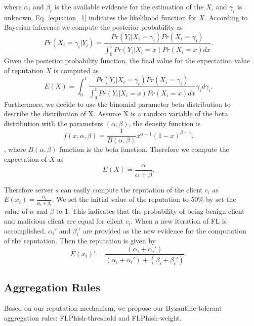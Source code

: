 \documentclass[journal]{IEEEtran}
\begin{document}
where $\alpha_i$ and $\beta_i$ is the available evidence for the estimation of the $X$, and $\gamma_i$ is unknown. Eq. \ref{equation_1} indicates the likelihood function for $X$. According to Bayesian inference we compute the posterior probability as
\begin{equation}
    Pr(X_i=\gamma _i|Y_i)=\frac{Pr\left ( Y_{i}|X_{i}=\gamma_{i} \right )Pr(X_{i}=\gamma_{i})}{\int_{0}^{1}Pr\left ( Y_{i}|X_{i}=x \right )Pr(X_{i}=x)dx}\label{equation_2}.
\end{equation}
Given the posterior probability function, the final value for the expectation value of reputation $X$ is computed as
\begin{equation}
    E(X)=\int_{0}^{1}\frac{Pr\left ( Y_{i}|X_{i}=\gamma_{i} \right )Pr(X_{i}=\gamma_{i})}{\int_{0}^{1}Pr\left ( Y_{i}|X_{i}=x \right )Pr(X_{i}=x)dx}\gamma_{i}d\gamma_{i}\label{equation_3}.
\end{equation}
Furthermore, we decide to use the binomial parameter beta distribution to describe the distribution of X. Assume X is a random variable of the beta distribution with the parameters $(\alpha, \beta)$, the density function is
\begin{equation}
    f(x,\alpha,\beta)=\frac{1}{B(\alpha,\beta)}x^{\alpha-1}(1-x)^{\beta-1}\label{equation-4}.
\end{equation}
, where $B(\alpha, \beta)$ function is the beta function. Therefore we compute the expectation of $X$ as
\begin{equation}
    E(X)=\frac{\alpha}{\alpha+\beta}.
\end{equation}

Therefore server ${s}$ can easily compute the reputation of the client ${c_{i}}$ as ${E(x_{i})=\frac{\alpha_{i}}{\alpha_{i}+\beta_{i}}}$. We set the initial value of the reputation to 50\% by set the value of ${\alpha}$ and ${\beta}$ to 1. This indicates that the probability of being benign client and malicious client are equal for client ${c_{i}}$. When a new iteration of FL is accomplished, ${\alpha_{i}}'$ and ${\beta_{i}}'$ are provided as the new evidence for the computation of the reputation. Then the reputation is given by
\begin{equation}
    {E(x_{i})}'=\frac{(\alpha_{i}+{\alpha_{i}}')}{(\alpha_{i}+{\alpha_{i}}')+(\beta_{i}+{\beta_{i}}')}.
\end{equation}



\subsection{Aggregation Rules}
Based on our reputation mechanism, we propose our Byzantine-tolerant aggregation rules: FLPhish-threshold and FLPhish-weight.
\end{document}
